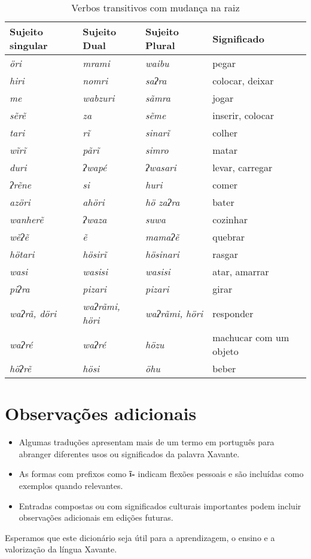 \begin{table}
\begin{tabular}{llll}\toprule
 Sujeito singular & Sujeito Dual & Sujeito Plural & Significado  \\\midrule
\textit{öri} & \textit{mrami} & \textit{waibu} & pegar\\
\textit{hiri} & \textit{nomri} & \textit{saʔra} & colocar, deixar \\
\textit{me} & \textit{wabzuri} & \textit{sãmra} & jogar \\
\textit{sẽrẽ} & \textit{za} & \textit{sẽme} & inserir, colocar\\
\textit{tari} & \textit{rĩ} & \textit{sinarĩ} & colher \\
\textit{wĩrĩ} & \textit{pãrĩ} & \textit{simro} & matar \\ 
\textit{duri} & \textit{ʔwapé} & \textit{ʔwasari} & levar, carregar\\
\textit{ʔrẽne} & \textit{si} & \textit{huri} & comer \\
\textit{azöri} & \textit{ahöri} & \textit{hö zaʔra} & bater \\
\textit{wanherẽ} & \textit{ʔwaza} & \textit{suwa} & cozinhar \\
\textit{wẽʔẽ} & \textit{ẽ} & \textit{mamaʔẽ} & quebrar \\
\textit{hötari} & \textit{hösirĩ} & \textit{hösinari} & rasgar \\
\textit{wasi} & \textit{wasisi} & \textit{wasisi} & atar, amarrar \\
\textit{piʔra} & \textit{pizari} & \textit{pizari} & girar \\
\textit{waʔrã, döri} & \textit{waʔrãmi, höri} & \textit{waʔrãmi, höri} & responder \\
\textit{waʔré} & \textit{waʔré} & \textit{hözu} & machucar com um objeto \\
\textit{höʔrẽ} & \textit{hösi} & \textit{öhu} & beber \\\bottomrule
\end{tabular}
\caption{Verbos transitivos com mudança na raiz}
\label{tab:suppletiveTransVerbs}
\end{table}



\section*{Observações adicionais}

\begin{itemize}
  \item Algumas traduções apresentam mais de um termo em português para abranger diferentes usos ou significados da palavra Xavante.
  \item As formas com prefixos como \textbf{ĩ-} indicam flexões pessoais e são incluídas como exemplos quando relevantes.
  \item Entradas compostas ou com significados culturais importantes podem incluir observações adicionais em edições futuras.
\end{itemize}

Esperamos que este dicionário seja útil para a aprendizagem, o ensino e a valorização da língua Xavante.
